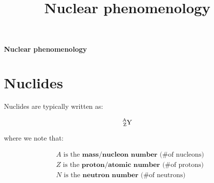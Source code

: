 \documentclass[10pt]{article}
\theoremstyle{definition}
\begin{document}
\setcounter{section}{1}
\title{Nuclear phenomenology}

\pagestyle{fancy}
\fancyhf{}
\setlength{\headheight}{12.0pt}

\begin{center}
{\LARGE \bf Nuclear phenomenology}\\
\end{center}

\section*{Nuclides}%


Nuclides are typically written as:

$$\ce{^{A}_{Z}Y}$$

where we note that:

\begin{align*}
    &A\text{ is the }\textbf{mass/nucleon number}\text{ (\# of nucleons)}\\
    &Z\text{ is the }\textbf{proton/atomic number}\text{ (\# of protons)}\\
    &N\text{ is the }\textbf{neutron number}\text{ (\# of neutrons)}\\
\end{align*}
\end{document}
